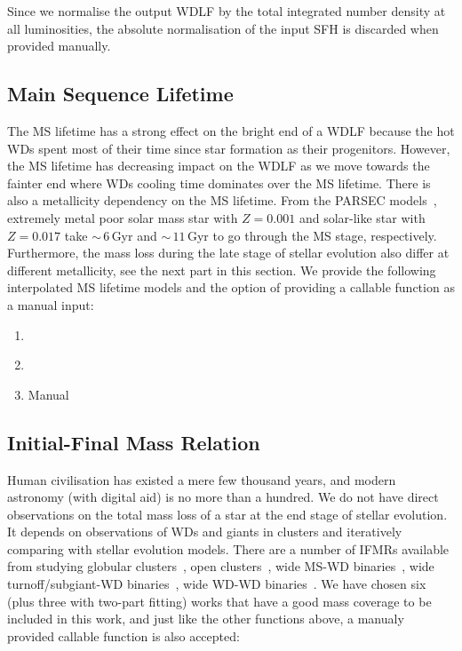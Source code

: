 \documentclass[fleqn,usenatbib]{rasti}
\begin{document}
Since we normalise the output WDLF by the total integrated number density at
all luminosities, the absolute normalisation of the input SFH is discarded when
provided manually.

\subsection{Main Sequence Lifetime}
The MS lifetime has a strong effect on the bright end of a WDLF because the hot
WDs spent most of their time since star formation as their progenitors.
However, the MS lifetime has decreasing impact on the WDLF as we move towards
the fainter end where WDs cooling time dominates over the MS lifetime. There is
also a metallicity dependency on the MS lifetime. From the PARSEC
models~\citep{2013EPJWC..4303001B}, extremely metal poor solar mass star with
$Z=0.001$ and solar-like star with $Z=0.017$ take $\sim$\,$6$\,Gyr and
$\sim$\,$11$\,Gyr to go through the MS stage, respectively. Furthermore,
the mass loss during the late stage of stellar evolution also differ at
different metallicity, see the next part in this section. We provide the
following interpolated MS lifetime models and the option of providing a
callable function as a manual input:

\begin{enumerate}
    \item \citet{2013EPJWC..4303001B}
    \item \citet{2016ApJ...823..102C}
    \item Manual
\end{enumerate}

\subsection{Initial-Final Mass Relation}
Human civilisation has existed a mere few thousand years, and modern astronomy
(with digital aid) is no more than a hundred. We do not have direct
observations on the total mass loss of a star at the end stage of stellar
evolution. It depends on observations of WDs and giants in clusters and
iteratively comparing with stellar evolution models. There are a number of
IFMRs available from studying globular clusters~\citep{2004A&A...420..515M,
2009ApJ...705..408K}, open clusters~\citep{2009ApJ...693..355W,
2016ApJ...818...84C}, wide MS-WD binaries~\citep{2008A&A...477..213C,
2012ApJ...746..144Z, 2018ApJ...860L..17E}, wide turnoff/subgiant-WD
binaries~\citep{2021ApJ...923..181B}, wide WD-WD
binaries~\citep{2015ASPC..493..325C, 2015ApJ...815...63A, 2018ApJ...866...21C}.
We have chosen six (plus three with two-part fitting) works that have a
good mass coverage to be included in this work, and just like the other
functions above, a manualy provided callable function is also accepted:
\end{document}
